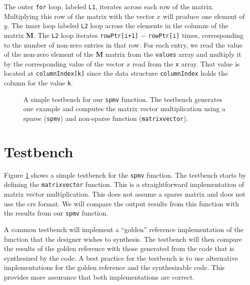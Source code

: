 The outer \lstinline{for} loop, labeled \lstinline{L1}, iterates across each row of the matrix. Multiplying this row of the matrix with the vector $x$ will produce one element of $y$.  The inner loop labeled \lstinline{L2} loop across the elements in the columns of the matrix $\mathbf{M}$. The \lstinline{L2} loop iterates \lstinline{rowPtr[i+1]} $-$ \lstinline{rowPtr[i]} times, corresponding to the number of non-zero entries in that row. For each entry, we read the value of the non-zero element of the $\mathbf{M}$ matrix from the \lstinline{values} array and multiply it by the corresponding value of the vector $x$ read from the \lstinline{x} array. That value is located at \lstinline{columnIndex[k]} since the data structure \lstinline{columnIndex} holds the column for the value \lstinline{k}. 

\begin{figure}

\caption{  A simple testbench for our \lstinline{spmv} function. The testbench generates one example and computes the matrix vector multiplication using a sparse (\lstinline{spmv}) and non-sparse function (\lstinline{matrixvector}).}
\label{fig:spmv_test}
\end{figure}

\section{Testbench}

Figure \ref{fig:spmv_test} shows a simple testbench for the \lstinline{spmv} function. The testbench starts by defining the \lstinline{matrixvector} function. This is a straightforward implementation of matrix vector multiplication. This does not assume a sparse matrix and does not use the \gls{crs} format. We will compare the output results from this function with the results from our \lstinline{spmv} function. 

\begin{aside}
A common testbench will implement a ``golden'' reference implementation of the function that the designer wishes to synthesis. The testbench will then compare the results of the golden reference with those generated from the code that is synthesized by the \VHLS code. A best practice for the testbench is to use alternative implementations for the golden reference and the synthesizable code. This provides more assurance that both implementations are correct. 
\end{aside}

